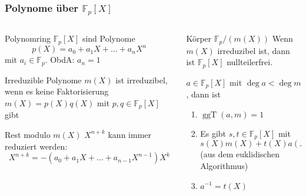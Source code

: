 %
%
%
\begin{frame}[t]
\frametitle{Polynome über $\mathbb{F}_p[X]$}
\setlength{\abovedisplayskip}{5pt}
\setlength{\belowdisplayskip}{5pt}
\vspace{-15pt}
\begin{columns}[t,onlytextwidth]
\begin{column}{0.48\textwidth}
\begin{block}{Polynomring}
$\mathbb{F}_p[X]$ sind Polynome
\[
p(X)
=
a_0+a_1X+\dots+a_nX^n
\]
mit $a_i\in\mathbb{F}_p$.
ObdA: $a_n=1$

\end{block}
\begin{block}{Irreduzible Polynome}
$m(X)$ ist irreduzibel, wenn es keine Faktorisierung
$m(X)=p(X)q(X)$ mit $p,q\in\mathbb{F}_p[X]$ gibt
\end{block}
\begin{block}{Rest modulo $m(X)$}
$X^{n+k}$ kann immer reduziert werden:
\[
X^{n+k} = -(a_0+a_1X+\dots+a_{n-1}X^{n-1})X^k
\]
\end{block}
\end{column}
\begin{column}{0.48\textwidth}
\begin{block}{Körper $\mathbb{F}_p/(m(X))$}
Wenn $m(X)$ irreduzibel ist, dann ist
$\mathbb{F}_p[X]$ nullteilerfrei.
\medskip

$a\in \mathbb{F}_p[X]$ mit $\deg a < \deg m$, dann ist
\begin{enumerate}
\item
$\operatorname{ggT}(a,m) = 1$
\item
Es gibt $s,t\in\mathbb{F}_p[X]$ mit
\[
s(X)m(X)+t(X)a(X) = 1
\]
(aus dem euklidischen Algorithmus)
\item
$a^{-1} = t(X)$
\end{enumerate}
\end{block}
\end{column}
\end{columns}
\end{frame}
